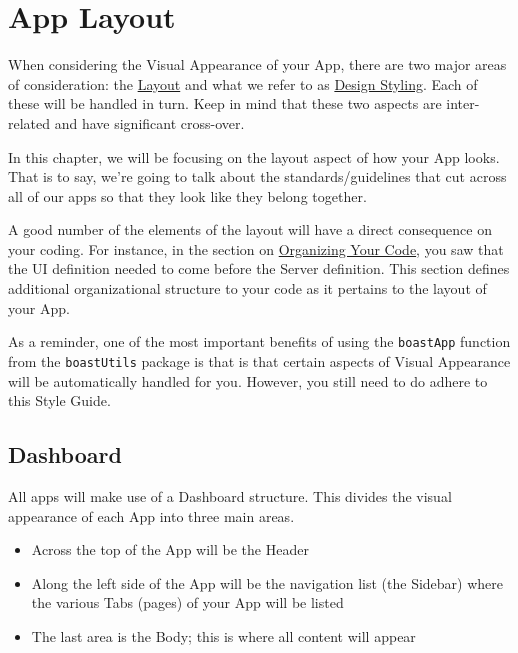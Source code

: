 \documentclass[
]{book}
\providecommand{\tightlist}{%
  \setlength{\itemsep}{0pt}\setlength{\parskip}{0pt}}
\begin{document}
\hypertarget{layoutb}{%
\chapter{App Layout}\label{layoutb}}

When considering the Visual Appearance of your App, there are two major areas of consideration: the \protect\hyperlink{layoutb}{Layout} and what we refer to as \protect\hyperlink{designStyleb}{Design Styling}. Each of these will be handled in turn. Keep in mind that these two aspects are inter-related and have significant cross-over.

In this chapter, we will be focusing on the layout aspect of how your App looks. That is to say, we're going to talk about the standards/guidelines that cut across all of our apps so that they look like they belong together.

A good number of the elements of the layout will have a direct consequence on your coding. For instance, in the section on \protect\hyperlink{orgCodeb}{Organizing Your Code}, you saw that the UI definition needed to come before the Server definition. This section defines additional organizational structure to your code as it pertains to the layout of your App.

As a reminder, one of the most important benefits of using the \texttt{boastApp} function from the \texttt{boastUtils} package is that is that certain aspects of Visual Appearance will be automatically handled for you. However, you still need to do adhere to this Style Guide.

\hypertarget{dashboardb}{%
\section{Dashboard}\label{dashboardb}}

All apps will make use of a Dashboard structure. This divides the visual appearance of each App into three main areas.

\begin{itemize}
\tightlist
\item
  Across the top of the App will be the Header
\item
  Along the left side of the App will be the navigation list (the Sidebar) where the various Tabs (pages) of your App will be listed
\item
  The last area is the Body; this is where all content will appear
\end{itemize}
\end{document}

